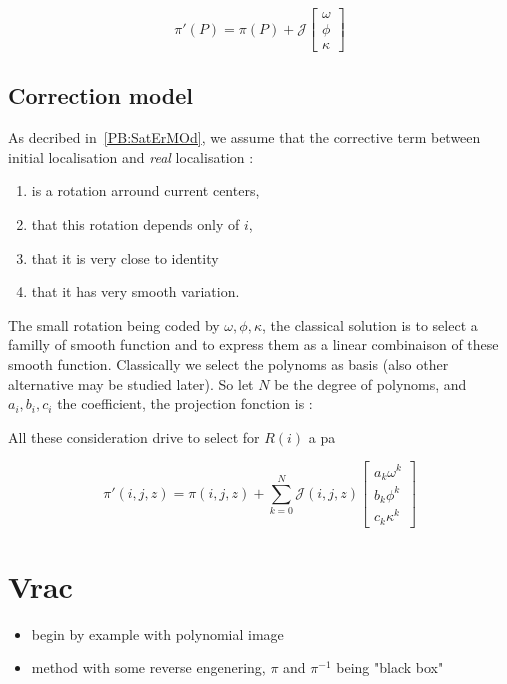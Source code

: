 \begin{equation}
	 \pi'(P) =  \pi(P)  + \mathcal{J} \begin{bmatrix} \omega \\ \phi \\ \kappa  \end{bmatrix}
\end{equation}


\subsection{Correction model}

As decribed in~\ref{PB:SatErMOd}, we assume that the corrective term between
initial localisation and \emph{real} localisation :

\begin{enumerate}
        \item  is a rotation arround current centers, 
	\item  that this rotation depends only of $i$,
	\item  that it  is very close to identity 
	\item  that it  has very smooth variation.
\end{enumerate}

The small rotation being coded by $\omega,\phi,\kappa$, the classical solution
is to  select a  familly of smooth function and to express them as a linear combinaison
of these smooth function.  Classically we select the polynoms as basis (also other
alternative may be studied later).  So let $N$ be the degree of polynoms,
and $a_i,b_i,c_i$  the coefficient, the projection fonction is :

All these consideration  drive to select for $R(i)$ a pa

\begin{equation}
	 \pi'(i,j,z) =  \pi(i,j,z)  + \sum _{k=0}^{N}  \mathcal{J}(i,j,z)  
                                                \begin{bmatrix} a_k \omega^k \\ b_k \phi^k  \\ c_k \kappa^k  \end{bmatrix}
\end{equation}
\section{Vrac}

\begin{itemize}
    \item begin by example with polynomial image
    \item method with some reverse engenering,  $\pi$ and $\pi^{-1}$ being "black box"
\end{itemize}





